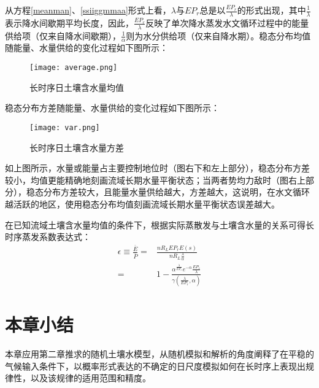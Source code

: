 从方程\ref{meanman}、\ref{ssiiggmmaa}形式上看，$\lambda$与$EP_r$总是以$\frac{EP_r}{\lambda}$的形式出现，其中$\frac{1}{\lambda}$表示降水间歇期平均长度，因此，$\frac{EP_r}{\lambda}$反映了单次降水蒸发水文循环过程中的能量供给项（仅来自降水间歇期），$\frac{1}{\alpha}$则为水分供给项（仅来自降水期）。稳态分布均值随能量、水量供给的变化过程如下图所示：
\begin{figure}[H]
\centering
\texttt{[image: average.png]}
\caption{长时序日土壤含水量均值}
\label{ununity}
\end{figure}
稳态分布方差随能量、水量供给的变化过程如下图所示：
\begin{figure}[H]
\centering
\texttt{[image: var.png]}
\caption{长时序日土壤含水量方差}
\label{ununity}
\end{figure}
如上图所示，水量或能量占主要控制地位时（图右下和左上部分），稳态分布方差较小，均值更能精确地刻画流域长期水量平衡状态；当两者势均力敌时（图右上部分），稳态分布方差较大，且能量水量供给越大，方差越大，这说明，在水文循环越活跃的地区，使用稳态分布均值刻画流域长期水量平衡状态误差越大。

在已知流域土壤含水量均值的条件下，根据实际蒸散发与土壤含水量的关系可得长时序蒸发系数表达式：
\begin{equation}
\label{pbudyko}
\begin{split}
\epsilon \equiv \frac{\overline{E}}{\overline{P}}
=& \frac{nR_LEP_rE(s)}{nR_L\frac{\lambda}{\alpha}}\\
=&1-\frac{\alpha^{\frac{\lambda}{EP_r}} e^{-\alpha} \frac{EP_r}{\lambda}}{\gamma (\frac{\lambda}{EP_r},\alpha)}
\end{split}
\end{equation}
\iffalse
在将上式与与Budyko曲线建立联系时，过去的研究认为$\frac{\lambda}{\alpha}$项体现了日平均水量供给，而$EP_r$项体现了日平均的能量供给\cite{porporato2004soil}，但从方程形式上看，$\lambda$与$EP_r$总是以$\frac{EP_r}{\lambda}$的形式出现，其中$\frac{1}{\lambda}$表示降水间歇期，因此本论文认为，$\frac{EP_r}{\lambda}$才是真正反映单次降水蒸发水文循环过程中的能量供给项，$\frac{1}{\alpha}$则为水分供给项。


为了衡量各变量对中长期平均水量平衡及其模拟精度的影响，可以对式\ref{meanman}、\ref{ssiiggmmaa}进行求导解析以确定变量贡献。
\fi


\section{本章小结}
本章应用第二章推求的随机土壤水模型，从随机模拟和解析的角度阐释了在平稳的气候输入条件下，以概率形式表达的不确定的日尺度模拟如何在长时序上表现出规律性，以及该规律的适用范围和精度。


